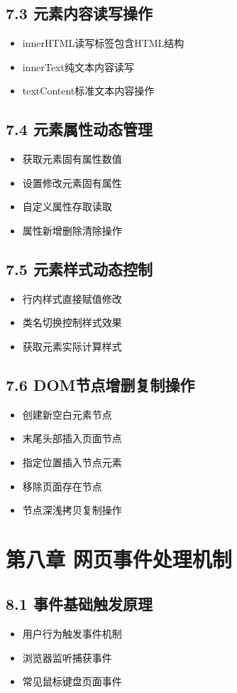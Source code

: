 \subsection{7.3 元素内容读写操作}
\begin{itemize}
\item innerHTML读写标签包含HTML结构
\item innerText纯文本内容读写
\item textContent标准文本内容操作
\end{itemize}

\subsection{7.4 元素属性动态管理}
\begin{itemize}
\item 获取元素固有属性数值
\item 设置修改元素固有属性
\item 自定义属性存取读取
\item 属性新增删除清除操作
\end{itemize}

\subsection{7.5 元素样式动态控制}
\begin{itemize}
\item 行内样式直接赋值修改
\item 类名切换控制样式效果
\item 获取元素实际计算样式
\end{itemize}

\subsection{7.6 DOM节点增删复制操作}
\begin{itemize}
\item 创建新空白元素节点
\item 末尾头部插入页面节点
\item 指定位置插入节点元素
\item 移除页面存在节点
\item 节点深浅拷贝复制操作
\end{itemize}

\section{第八章 网页事件处理机制}
\subsection{8.1 事件基础触发原理}
\begin{itemize}
\item 用户行为触发事件机制
\item 浏览器监听捕获事件
\item 常见鼠标键盘页面事件
\end{itemize}

